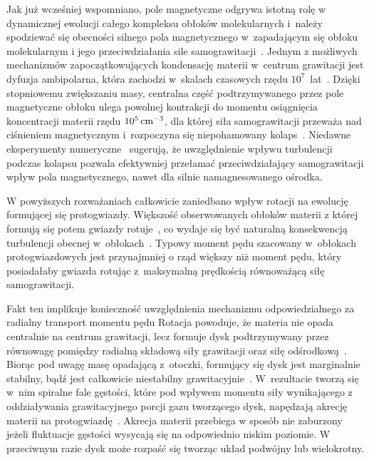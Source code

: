 \par Jak już wcześniej wspomniano, pole magnetyczne odgrywa istotną rolę w
dynamicznej ewolucji całego kompleksu obłoków molekularnych i~należy spodziewać
się obecności silnego pola magnetycznego w~zapadającym się obłoku molekularnym i
jego przeciwdziałania sile samograwitacji~\cite{MC99}. Jednym z możliwych
mechanizmów zapoczątkowujących kondensację materii w~centrum grawitacji jest
dyfuzja ambipolarna, która zachodzi w~skalach czasowych rzędu
$10^7$~lat~\cite{MZGH93}.  Dzięki stopniowemu zwiększaniu masy, centralna część
podtrzymywanego przez pole magnetyczne obłoku ulega powolnej kontrakcji do
momentu osiągnięcia koncentracji materii rzędu $10^{5}\hbox{$\thinspace\textrm{cm}$}^{-3}$, dla której
siła samograwitacji przeważa nad ciśnieniem magnetycznym i~rozpoczyna się
niepohamowany kolaps~\cite{BM94, CB00}. Niedawne eksperymenty
numeryczne~\cite{JHCF13} sugerują, że uwzględnienie wpływu turbulencji podczas
kolapsu pozwala efektywniej przełamać przeciwdziałający samograwitacji wpływ
pola magnetycznego, nawet dla silnie namagnesowanego ośrodka.

\par W powyższych rozważaniach całkowicie zaniedbano wpływ rotacji na ewolucję
formującej się protogwiazdy. Większość obserwowanych obłoków materii z której
formują się potem gwiazdy rotuje~\cite{GBFM93}, co wydaje się być naturalną
konsekwencją turbulencji obecnej w~obłokach~\cite{BB00}. Typowy moment pędu
szacowany w~obłokach protogwiazdowych jest przynajmniej o rząd większy niż
moment pędu, który posiadałaby gwiazda rotując z~maksymalną prędkością
równoważącą siłę samograwitacji. 

Fakt ten implikuje konieczność uwzględnienia mechanizmu odpowiedzialnego za
radialny transport momentu pędu Rotacja powoduje, że materia nie opada
centralnie na centrum grawitacji, lecz formuje dysk podtrzymywany przez
równowagę pomiędzy radialną składową siły grawitacji oraz siłę
odśrodkową~\cite{TSC84}. Biorąc pod uwagę masę opadającą z~otoczki, formujący
się dysk jest marginalnie stabilny, bądź jest całkowicie niestabilny
grawitacyjnie~\cite{SKBT94}. W~rezultacie tworzą się w~nim spiralne fale
gęstości, które pod wpływem momentu siły wynikającego z oddziaływania
grawitacyjnego porcji gazu tworzącego dysk, napędzają akrecję materii na
protogwiazdę~\cite{St00}.
Akrecja materii przebiega w sposób nie zaburzony jeżeli fluktuacje gęstości
wysycają się na odpowiednio niskim poziomie. W przeciwnym razie dysk może
rozpaść się tworząc układ podwójny lub wielokrotny.

